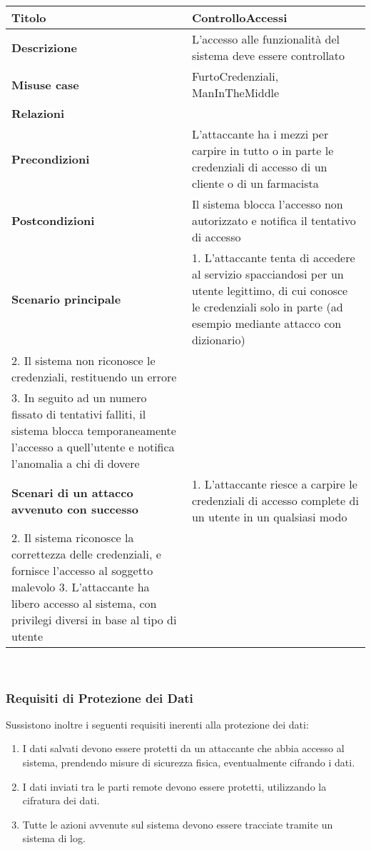 \begin{tabular} {|P{4cm}|P{13cm}|}
\hline
  \textbf{Titolo} & ControlloAccessi\\
\hline
  \textbf{Descrizione} & L'accesso alle funzionalità del sistema deve essere controllato\\
\hline
  \textbf{Misuse case} & FurtoCredenziali, ManInTheMiddle\\
\hline
  \textbf{Relazioni} &\\
\hline
  \textbf{Precondizioni} & L'attaccante ha i mezzi per carpire in tutto o in parte le credenziali di accesso di un cliente o di un farmacista\\
\hline
  \textbf{Postcondizioni} & Il sistema blocca l'accesso non autorizzato e notifica il tentativo di accesso\\
\hline
  \textbf{Scenario principale} & 1. L'attaccante tenta di accedere al servizio spacciandosi per un utente legittimo, di cui conosce le credenziali solo in parte (ad esempio mediante attacco con dizionario) \\ 2. Il sistema non riconosce le credenziali, restituendo un errore \\ 3. In seguito ad un numero fissato di tentativi falliti, il sistema blocca temporaneamente l'accesso a quell'utente e notifica l'anomalia a chi di dovere\\
\hline
  \textbf{Scenari di un attacco avvenuto con successo} & 1. L'attaccante riesce a carpire le credenziali di accesso complete di un utente in un qualsiasi modo \\ 2. Il sistema riconosce la correttezza delle credenziali, e fornisce l'accesso al soggetto malevolo 3. L'attaccante ha libero accesso al sistema, con privilegi diversi in base al tipo di utente\\
\hline
\end{tabular}
\\

\subsubsection{Requisiti di Protezione dei Dati}

Sussistono inoltre i seguenti requisiti inerenti alla protezione dei dati: 
\begin{enumerate}
 \item I dati salvati devono essere protetti da un attaccante che abbia accesso al sistema, prendendo misure
di sicurezza fisica, eventualmente cifrando i dati. 
 \item I dati inviati tra le parti remote devono essere protetti, utilizzando la cifratura dei
dati. 
 \item Tutte le azioni avvenute sul sistema devono essere tracciate
tramite un sistema di log. 
\end{enumerate}

